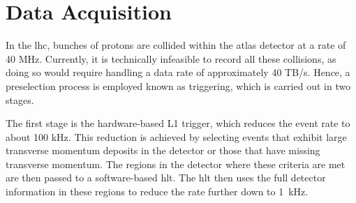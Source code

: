 \section{Data Acquisition}\label{sec:tdaq}
In the \ac{lhc}, bunches of protons are collided within the \ac{atlas} detector at a rate of 40 MHz. Currently, it is technically infeasible to record all these collisions, as doing so would require handling a data rate of approximately 40 TB/s. Hence, a preselection process is employed known as triggering, which is carried out in two stages.

The first stage is the hardware-based L1 trigger, which reduces the event rate to about 100 kHz. This reduction is achieved by selecting events that exhibit large transverse momentum deposits in the detector or those that have missing transverse momentum. The regions in the detector where these criteria are met are then passed to a software-based \ac{hlt}. The \ac{hlt} then uses the full detector information in these regions to reduce the rate further down to \qty[]{1}{kHz}.
